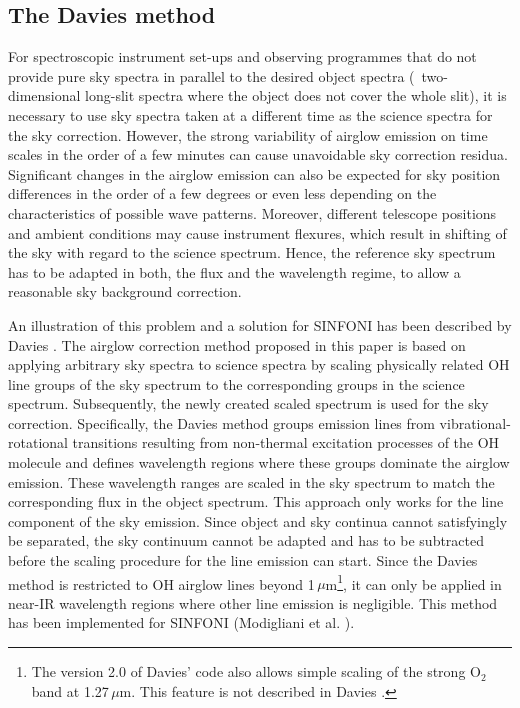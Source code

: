 \subsection{The Davies method}\label{sec:davies}
For spectroscopic instrument set-ups and observing programmes that do not
provide pure sky spectra in parallel to the desired object spectra (\eg\
two-dimensional long-slit spectra where the object does not cover the whole
slit), it is necessary to use sky spectra taken at a different time as the
science spectra for the sky correction. However, the strong variability of
airglow emission on time scales in the order of a few minutes can
cause unavoidable sky correction residua. Significant changes in the airglow
emission can also be expected for sky position differences in the order of a
few degrees or even less depending on the characteristics of possible wave
patterns. Moreover, different telescope positions and ambient conditions may
cause instrument flexures, which result in shifting of the sky with regard to
the science spectrum. Hence, the reference sky spectrum has to be adapted in
both, the flux and the wavelength regime, to allow a reasonable sky background
correction.

An illustration of this problem and a solution for SINFONI has been described
by Davies \cite{DAV07}. The airglow correction method proposed in this paper is
based on applying arbitrary sky spectra to science spectra by scaling
physically related OH line groups of the sky spectrum to the corresponding
groups in the science spectrum. Subsequently, the newly created scaled spectrum
is used for the sky correction. Specifically, the Davies method groups emission
lines from vibrational-rotational transitions resulting from non-thermal
excitation processes of the OH molecule and defines wavelength regions where
these groups dominate the airglow emission. These wavelength ranges are scaled
in the sky spectrum to match the corresponding flux in the object spectrum.
This approach only works for the line component of the sky emission. Since
object and sky continua cannot satisfyingly be separated, the sky continuum
cannot be adapted and has to be subtracted before the scaling procedure for the
line emission can start. Since the Davies method is restricted to OH airglow
lines beyond 1\,$\mu$m\footnote{The version 2.0 of Davies' code also allows
simple scaling of the strong O$_2$ band at 1.27\,$\mu$m. This feature is not
described in Davies \cite{DAV07}.}, it can only be applied in near-IR
wavelength regions where other line emission is negligible. This method has
been implemented for SINFONI (Modigliani et al. \cite{MOD07}).

